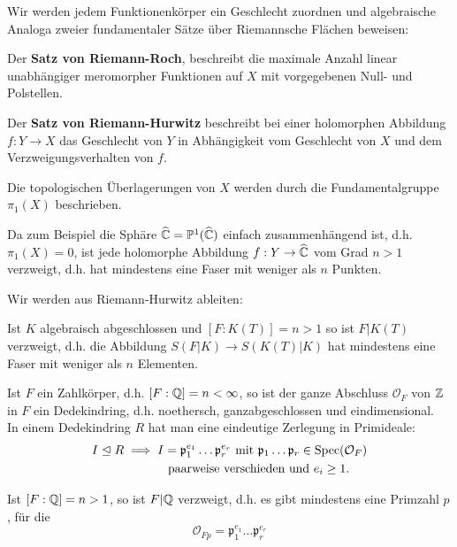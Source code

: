 \begin{bemerkungnr}
    Wir werden jedem Funktionenkörper ein Geschlecht zuordnen und algebraische Analoga zweier fundamentaler Sätze über
    Riemannsche Flächen beweisen:

    Der \textbf{Satz von Riemann-Roch}, beschreibt die maximale Anzahl linear unabhängiger meromorpher Funktionen auf $X$
    mit vorgegebenen Null- und Polstellen.

    Der \textbf{Satz von Riemann-Hurwitz} beschreibt bei einer holomorphen Abbildung $f: Y \to X$ das Geschlecht von $Y$ in
    Abhängigkeit vom Geschlecht von $X$ und dem Verzweigungsverhalten von $f$.
\end{bemerkungnr}

\begin{bemerkungnr}
    Die topologischen Überlagerungen von $X$ werden durch die Fundamentalgruppe $\pi_1(X)$ beschrieben.

    Da zum Beispiel die Sphäre $\widehat{\mathbb{C}} = \mathbb{P}^1(\widehat{\mathbb{C}})$ einfach zusammenhängend ist,
    d.h. $\pi_1(X) = 0$, ist jede holomorphe Abbildung $f: Y \to \widehat{\mathbb{C}}$ vom Grad $n > 1$ verzweigt,
    d.h. hat mindestens eine Faser mit weniger als $n$ Punkten.
\end{bemerkungnr}

Wir werden aus Riemann-Hurwitz ableiten:
\begin{theorem}
    Ist $K$ algebraisch abgeschlossen und $[F:K(T)] = n > 1$ so ist $F|K(T)$ verzweigt, d.h. die Abbildung
    $S(F|K) \to S(K(T)|K)$ hat mindestens eine Faser mit weniger als $n$ Elementen.    
\end{theorem}

\begin{bemerkungnr}
    Ist $F$ ein Zahlkörper, d.h. $[F:\mathbb{Q}] = n < \infty$, so ist der ganze Abschluss $\mathcal{O}_F$ von $\mathbb{Z}$ in $F$ ein Dedekindring,
    d.h. noethersch, ganzabgeschlossen und eindimensional.\\
    In einem Dedekindring $R$ hat man eine eindeutige Zerlegung in Primideale:
    \begin{align*}
        I \trianglelefteq R \implies I &= \mathfrak{p}_1^{e_1} \ldots \mathfrak{p}_r^{e_r} \text{ mit } \mathfrak{p}_1 \ldots \mathfrak{p}_r \in \operatorname{Spec}(\mathcal{O}_F)\\
        &  \text{ paarweise verschieden und } e_i \geq 1. 
    \end{align*}
\end{bemerkungnr}

\begin{theorem}[Minkowski 1910]
    Ist $[F:\mathbb{Q}] = n > 1$, so ist $F|\mathbb{Q}$ verzweigt, d.h. es gibt mindestens eine Primzahl $p$, für die
    $$ \mathcal{O}_{Fp} = \mathfrak{p}_1^{e_1} \ldots \mathfrak{p}_r^{e_r}$$
\end{theorem}

